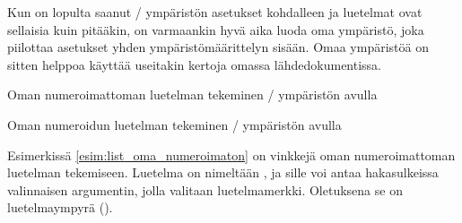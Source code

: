 Kun on lopulta saanut \-/ ympäristön asetukset
kohdalleen ja luetelmat ovat sellaisia kuin pitääkin, on varmaankin hyvä
aika luoda oma ympäristö, joka piilottaa asetukset yhden
ympäristömäärittelyn sisään. Omaa ympäristöä on sitten helppoa käyttää
useitakin kertoja omassa lähdedokumentissa.

\begin{esimerkki*}

\begin{koodilohko}
\newenvironment{numeroimaton}[1][\textbullet]{%
  \begin{list}{#1}{
      \setlength{\leftmargin}{1.1em}
      \setlength{\labelsep}{.2em}
      \setlength{\itemsep}{.4ex plus .1ex}
      \setlength{\parsep}{.2ex}
    }
  }{\end{list}}
\end{koodilohko}
  \caption{Oman numeroimattoman luetelman tekeminen \-/
    ympäristön avulla}
  \label{esim:list_oma_numeroimaton}
\end{esimerkki*}

\begin{esimerkki*}

\begin{koodilohko}
\newenvironment{numeroitu}[1][0]{%
  \begin{list}{\arabic{enumi}.}{
      \usecounter{enumi}
      \setcounter{enumi}{#1}
      \renewcommand{\makelabel}[1]{\hfill\bfseries\large ##1}
      \setlength{\leftmargin}{2em}
      \setlength{\labelsep}{.5em}
      \setlength{\itemsep}{.4ex plus .1ex}
      \setlength{\parsep}{.2ex}
    }
  }{\end{list}}
\end{koodilohko}
  \caption{Oman numeroidun luetelman tekeminen \-/
    ympäristön avulla}
  \label{esim:list_oma_numeroitu}
\end{esimerkki*}

Esimerkissä \ref{esim:list_oma_numeroimaton} on vinkkejä oman
numeroimattoman luetelman tekemiseen. Luetelma on nimeltään
, ja sille voi antaa hakasulkeissa valinnaisen
argumentin, jolla valitaan luetelmamerkki. Oletuksena se on
luetelmaympyrä ().

